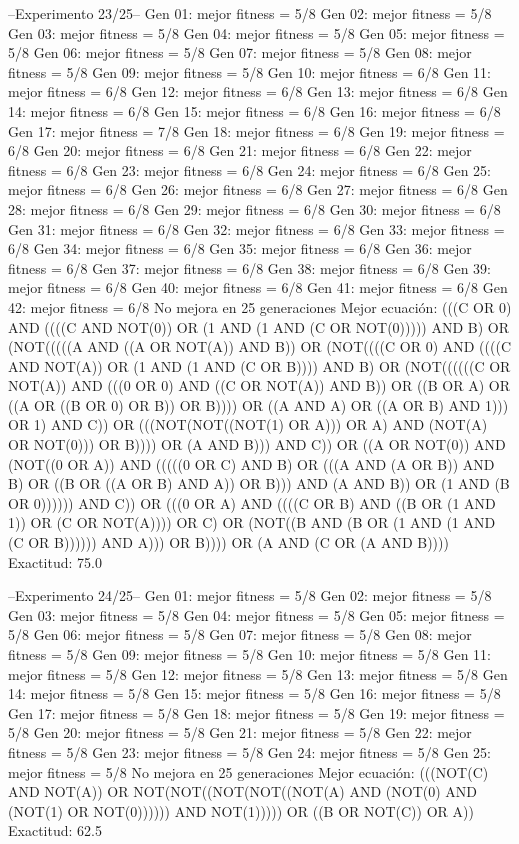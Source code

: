 --Experimento 
 23/25--
Gen 01: mejor fitness = 5/8
Gen 02: mejor fitness = 5/8
Gen 03: mejor fitness = 5/8
Gen 04: mejor fitness = 5/8
Gen 05: mejor fitness = 5/8
Gen 06: mejor fitness = 5/8
Gen 07: mejor fitness = 5/8
Gen 08: mejor fitness = 5/8
Gen 09: mejor fitness = 5/8
Gen 10: mejor fitness = 6/8
Gen 11: mejor fitness = 6/8
Gen 12: mejor fitness = 6/8
Gen 13: mejor fitness = 6/8
Gen 14: mejor fitness = 6/8
Gen 15: mejor fitness = 6/8
Gen 16: mejor fitness = 6/8
Gen 17: mejor fitness = 7/8
Gen 18: mejor fitness = 6/8
Gen 19: mejor fitness = 6/8
Gen 20: mejor fitness = 6/8
Gen 21: mejor fitness = 6/8
Gen 22: mejor fitness = 6/8
Gen 23: mejor fitness = 6/8
Gen 24: mejor fitness = 6/8
Gen 25: mejor fitness = 6/8
Gen 26: mejor fitness = 6/8
Gen 27: mejor fitness = 6/8
Gen 28: mejor fitness = 6/8
Gen 29: mejor fitness = 6/8
Gen 30: mejor fitness = 6/8
Gen 31: mejor fitness = 6/8
Gen 32: mejor fitness = 6/8
Gen 33: mejor fitness = 6/8
Gen 34: mejor fitness = 6/8
Gen 35: mejor fitness = 6/8
Gen 36: mejor fitness = 6/8
Gen 37: mejor fitness = 6/8
Gen 38: mejor fitness = 6/8
Gen 39: mejor fitness = 6/8
Gen 40: mejor fitness = 6/8
Gen 41: mejor fitness = 6/8
Gen 42: mejor fitness = 6/8
No mejora en 25 generaciones
Mejor ecuación: (((C OR 0) AND ((((C AND NOT(0)) OR (1 AND (1 AND (C OR NOT(0))))) AND B) OR (NOT(((((A AND ((A OR NOT(A)) AND B)) OR (NOT((((C OR 0) AND ((((C AND NOT(A)) OR (1 AND (1 AND (C OR B)))) AND B) OR (NOT((((((C OR NOT(A)) AND (((0 OR 0) AND ((C OR NOT(A)) AND B)) OR ((B OR A) OR ((A OR ((B OR 0) OR B)) OR B)))) OR ((A AND A) OR ((A OR B) AND 1))) OR 1) AND C)) OR (((NOT(NOT((NOT(1) OR A))) OR A) AND (NOT(A) OR NOT(0))) OR B)))) OR (A AND B))) AND C)) OR ((A OR NOT(0)) AND (NOT((0 OR A)) AND (((((0 OR C) AND B) OR (((A AND (A OR B)) AND B) OR ((B OR ((A OR B) AND A)) OR B))) AND (A AND B)) OR (1 AND (B OR 0)))))) AND C)) OR (((0 OR A) AND ((((C OR B) AND ((B OR (1 AND 1)) OR (C OR NOT(A)))) OR C) OR (NOT((B AND (B OR (1 AND (1 AND (C OR B)))))) AND A))) OR B)))) OR (A AND (C OR (A AND B))))
 Exactitud: 75.0%

--Experimento 
 24/25--
Gen 01: mejor fitness = 5/8
Gen 02: mejor fitness = 5/8
Gen 03: mejor fitness = 5/8
Gen 04: mejor fitness = 5/8
Gen 05: mejor fitness = 5/8
Gen 06: mejor fitness = 5/8
Gen 07: mejor fitness = 5/8
Gen 08: mejor fitness = 5/8
Gen 09: mejor fitness = 5/8
Gen 10: mejor fitness = 5/8
Gen 11: mejor fitness = 5/8
Gen 12: mejor fitness = 5/8
Gen 13: mejor fitness = 5/8
Gen 14: mejor fitness = 5/8
Gen 15: mejor fitness = 5/8
Gen 16: mejor fitness = 5/8
Gen 17: mejor fitness = 5/8
Gen 18: mejor fitness = 5/8
Gen 19: mejor fitness = 5/8
Gen 20: mejor fitness = 5/8
Gen 21: mejor fitness = 5/8
Gen 22: mejor fitness = 5/8
Gen 23: mejor fitness = 5/8
Gen 24: mejor fitness = 5/8
Gen 25: mejor fitness = 5/8
No mejora en 25 generaciones
Mejor ecuación: (((NOT(C) AND NOT(A)) OR NOT(NOT((NOT(NOT((NOT(A) AND (NOT(0) AND (NOT(1) OR NOT(0)))))) AND NOT(1))))) OR ((B OR NOT(C)) OR A))
 Exactitud: 62.5%

